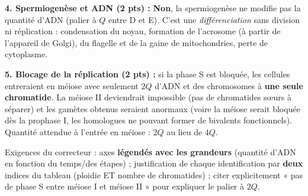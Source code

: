 \documentclass[11pt]{article}
\begin{document}
\begin{corrige}
\textbf{4. Spermiogenèse et ADN (2 pts) :} \textbf{Non}, la spermiogenèse ne modifie pas la quantité d'ADN (palier à $Q$ entre D et E). C'est une \emph{différenciation} sans division ni réplication : condensation du noyau, formation de l'acrosome (à partir de l'appareil de Golgi), du flagelle et de la gaine de mitochondries, perte de cytoplasme.

\textbf{5. Blocage de la réplication (2 pts) :} si la phase S est bloquée, les cellules entreraient en méiose avec seulement $2Q$ d'ADN et des chromosomes à \textbf{une seule chromatide}. La méiose II deviendrait impossible (pas de chromatides sœurs à séparer) et les gamètes obtenus seraient anormaux (voire la méiose serait bloquée dès la prophase I, les homologues ne pouvant former de bivalents fonctionnels). Quantité attendue à l'entrée en méiose : $2Q$ au lieu de $4Q$.
\end{corrige}

\begin{attention}
Exigences du correcteur : axes \textbf{légendés avec les grandeurs} (quantité d'ADN en fonction du temps/des étapes) ; justification de chaque identification par \textbf{deux} indices du tableau (ploidie ET nombre de chromatides) ; citer explicitement « pas de phase S entre méiose I et méiose II » pour expliquer le palier à $2Q$.
\end{attention}
\end{document}
